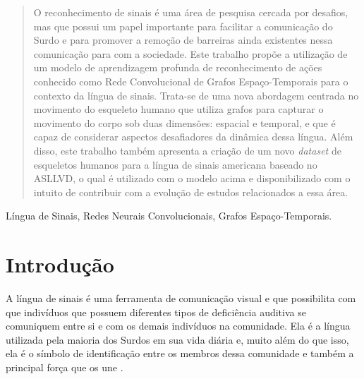 

\maketitle
\begin{abstract}
O reconhecimento de sinais é uma área de pesquisa cercada por desafios, mas que possui um papel importante para facilitar a comunicação do Surdo e para promover a remoção de barreiras ainda existentes nessa comunicação para com a sociedade. Este trabalho propõe a utilização de um modelo de aprendizagem profunda de reconhecimento de ações conhecido como Rede Convolucional de Grafos Espaço-Temporais para o contexto da língua de sinais. Trata-se de uma nova abordagem centrada no movimento do esqueleto humano que utiliza grafos para capturar o movimento do corpo sob duas dimensões: espacial e temporal, e que é capaz de considerar aspectos desafiadores da dinâmica dessa língua. Além disso, este trabalho também apresenta a criação de um novo \textit{dataset} de esqueletos humanos para a língua de sinais americana baseado no ASLLVD, o qual é utilizado com o modelo acima e disponibilizado com o intuito de contribuir com a evolução de estudos relacionados a essa área.
\end{abstract}

\begin{IEEEkeywords}
Língua de Sinais, Redes Neurais Convolucionais, Grafos Espaço-Temporais.
\end{IEEEkeywords}


\section{Introdução} %
\label{sec:introducao}

A língua de sinais é uma ferramenta de comunicação visual e que possibilita com que indivíduos que possuem diferentes tipos de deficiência auditiva se comuniquem entre si e com os demais indivíduos na comunidade. Ela é a língua utilizada pela maioria dos Surdos em sua vida diária e, muito além do que isso, ela é o símbolo de identificação entre os membros dessa comunidade e também a principal força que os une \cite{pereira-choi-2011}. 


